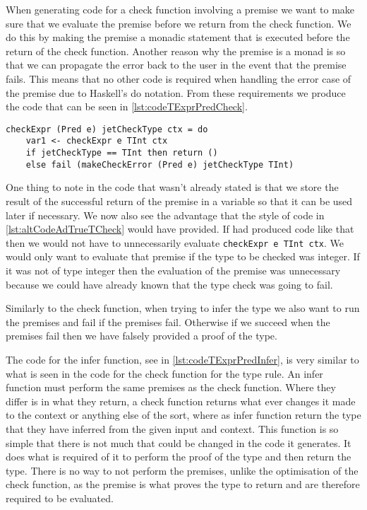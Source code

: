 When generating code for a check function involving a premise we want to make sure that we evaluate the premise before we return from the check function.
We do this by making the premise a monadic statement that is executed before the return of the check function.
Another reason why the premise is a monad is so that we can propagate the error back to the user in the event that the premise fails.
This means that no other code is required when handling the error case of the premise due to Haskell's do notation.
From these requirements we produce the code that can be seen in \autoref{lst:codeTExprPredCheck}.

\begin{lstlisting}[caption = Code generated for checkExpr from TExprPred, label=lst:codeTExprPredCheck]
checkExpr (Pred e) jetCheckType ctx = do
    var1 <- checkExpr e TInt ctx
    if jetCheckType == TInt then return () 
    else fail (makeCheckError (Pred e) jetCheckType TInt)
\end{lstlisting}

One thing to note in the code that wasn't already stated is that we store the result of the successful return of the premise in a variable so that it can be used later if necessary.
We now also see the advantage that the style of code in \autoref{lst:altCodeAdTrueTCheck} would have provided.
If had produced code like that then we would not have to unnecessarily evaluate \texttt{checkExpr e TInt ctx}.
We would only want to evaluate that premise if the type to be checked was integer.
If it was not of type integer then the evaluation of the premise was unnecessary because we could have already known that the type check was going to fail.

Similarly to the check function, when trying to infer the type we also want to run the premises and fail if the premises fail.
Otherwise if we succeed when the premises fail then we have falsely provided a proof of the type.

The code for the infer function, see in \autoref{lst:codeTExprPredInfer}, is very similar to what is seen in the code for the check function for the type rule.
An infer function must perform the same premises as the check function.
Where they differ is in what they return, a check function returns what ever changes it made to the context or anything else of the sort, where as infer function return the type that they have inferred from the given input and context.
This function is so simple that there is not much that could be changed in the code it generates.
It does what is required of it to perform the proof of the type and then return the type.
There is no way to not perform the premises, unlike the optimisation of the check function, as the premise is what proves the type to return and are therefore required to be evaluated.

